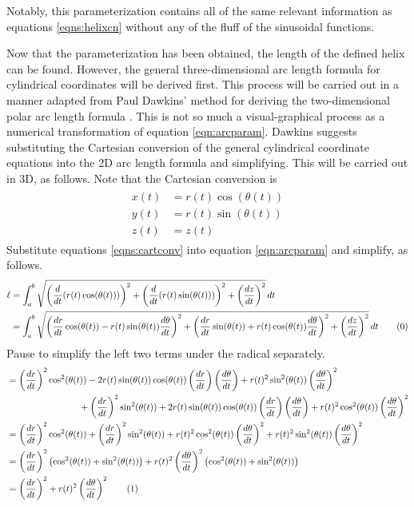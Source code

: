 \documentclass{article}
\begin{document}
Notably, this parameterization contains all of the same relevant information as equations \ref{eqns:helixcn} without any of the fluff of the sinusoidal functions.\par
Now that the parameterization has been obtained, the length of the defined helix can be found. However, the general three-dimensional arc length formula for cylindrical coordinates will be derived first. This process will be carried out in a manner adapted from Paul Dawkins' method for deriving the two-dimensional polar arc length formula \cite{Bib:polararc}. This is not so much a visual-graphical process as a numerical transformation of equation \ref{eqn:arcparam}. Dawkins suggests substituting the Cartesian conversion of the general cylindrical coordinate equations into the 2D arc length formula and simplifying. This will be carried out in 3D, as follows. Note that the Cartesian conversion is
\begin{align}\label{eqns:cartconv}
    \begin{split}
        x(t) &= r(t)\cos(\theta(t))\\
        y(t) &= r(t)\sin(\theta(t))\\
        z(t) &= z(t)
    \end{split}
\end{align}
Substitute equations \ref{eqns:cartconv} into equation \ref{eqn:arcparam} and simplify, as follows.
\begin{align*}
    \ell &= \int_a^b\sqrt{\left(\frac{d}{dt}(r(t)\cos(\theta(t)))\right)^2+\left(\frac{d}{dt}(r(t)\sin(\theta(t)))\right)^2+\left(\frac{dz}{dt}\right)^2}\, dt\\
    &= \int_a^b\sqrt{\left(\frac{dr}{dt}\cos(\theta(t))-r(t)\sin(\theta(t))\frac{d\theta}{dt}\right)^2+\left(\frac{dr}{dt}\sin(\theta(t))+r(t)\cos(\theta(t))\frac{d\theta}{dt}\right)^2+\left(\frac{dz}{dt}\right)^2}\, dt\tag{\theequation}\label{eqn:fin2}
    \stepcounter{equation}
\end{align*}
Pause to simplify the left two terms under the radical separately.
\begin{align*}
    &= \left(\frac{dr}{dt}\right)^2\cos^2(\theta(t))-2r(t)\sin(\theta(t))\cos(\theta(t))\left(\frac{dr}{dt}\right)\left(\frac{d\theta}{dt}\right)+r(t)^2\sin^2(\theta(t))\left(\frac{d\theta}{dt}\right)^2\\
    &\hspace{8em} +\left(\frac{dr}{dt}\right)^2\sin^2(\theta(t))+2r(t)\sin(\theta(t))\cos(\theta(t))\left(\frac{dr}{dt}\right)\left(\frac{d\theta}{dt}\right)+r(t)^2\cos^2(\theta(t))\left(\frac{d\theta}{dt}\right)^2\\
    &= \left(\frac{dr}{dt}\right)^2\cos^2(\theta(t))+\left(\frac{dr}{dt}\right)^2\sin^2(\theta(t))+r(t)^2\cos^2(\theta(t))\left(\frac{d\theta}{dt}\right)^2+r(t)^2\sin^2(\theta(t))\left(\frac{d\theta}{dt}\right)^2\\
    &= \left(\frac{dr}{dt}\right)^2\left(\cos^2(\theta(t))+\sin^2(\theta(t))\right)+r(t)^2\left(\frac{d\theta}{dt}\right)^2\left(\cos^2(\theta(t))+\sin^2(\theta(t))\right)\\
    &= \left(\frac{dr}{dt}\right)^2+r(t)^2\left(\frac{d\theta}{dt}\right)^2\tag{\theequation}\label{eqn:radical}
    \stepcounter{equation}
\end{align*}
\end{document}
